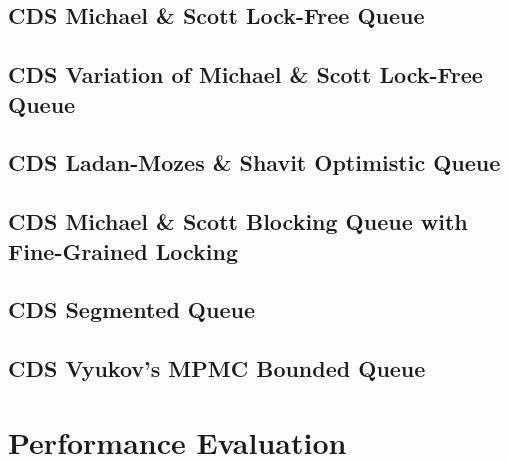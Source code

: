 \subsection[CDS MSQueue]{CDS Michael \& Scott Lock-Free Queue} \label{subsec:cds-ms}

\subsection[CDS MoirQueue]{CDS Variation of Michael \& Scott Lock-Free Queue} \label{subsec:cds-moir}

\subsection[CDS OptimisticQueue]{CDS Ladan-Mozes \& Shavit Optimistic Queue} \label{subsec:cds-optimistic}

\subsection[CDS RWQueue]{CDS Michael \& Scott Blocking Queue with Fine-Grained Locking} \label{subsec:cds-rw}

\subsection[CDS SegmentedQueue]{CDS Segmented Queue} \label{subsec:cds-segmented}

\subsection[CDS VyukovMPMCCycleQueue]{CDS Vyukov's MPMC Bounded Queue} \label{subsec:cds-vyukovmpmccycle}


\section[Performance Evaluation]{Performance Evaluation}
